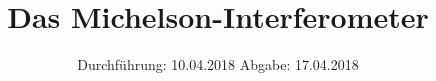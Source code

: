 


\subject{Versuch 401}
\title{Das Michelson-Interferometer}
\date{%
  Durchführung: 10.04.2018
  \hspace{3em}
  Abgabe: 17.04.2018
}



\maketitle
\thispagestyle{empty}
\tableofcontents
\newpage






\printbibliography{}


